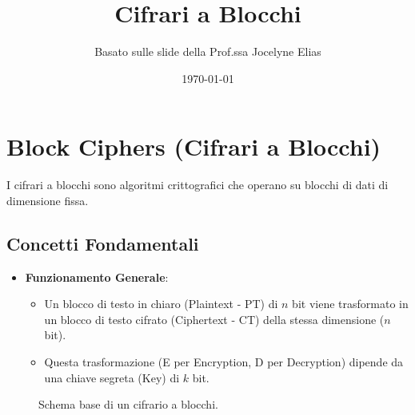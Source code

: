 

\title{Cifrari a Blocchi}
\author{Basato sulle slide della Prof.ssa Jocelyne Elias}
\date{\today}



\maketitle
\tableofcontents
\newpage

\section{Block Ciphers (Cifrari a Blocchi)}

I cifrari a blocchi sono algoritmi crittografici che operano su blocchi di dati di dimensione fissa.

\subsection{Concetti Fondamentali}
\begin{itemize}
    \item \textbf{Funzionamento Generale}:
    \begin{itemize}
        \item Un blocco di testo in chiaro (Plaintext - PT) di $n$ bit viene trasformato in un blocco di testo cifrato (Ciphertext - CT) della stessa dimensione ($n$ bit).
        \item Questa trasformazione (E per Encryption, D per Decryption) dipende da una chiave segreta (Key) di $k$ bit.
    \end{itemize}
\end{itemize}

\begin{figure}[H]
\centering
{}
\caption{Schema base di un cifrario a blocchi.}
\end{figure}

